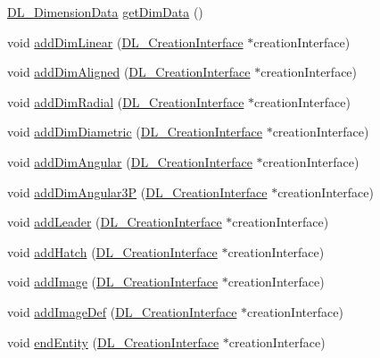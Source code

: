 \begin{DoxyCompactItemize}
\item 
\hyperlink{structDL__DimensionData}{D\-L\-\_\-\-Dimension\-Data} \hyperlink{classDL__Jww_a5a9706b7ab9fa9fe7c8ff45633d4f2c8}{get\-Dim\-Data} ()
\item 
void \hyperlink{classDL__Jww_aac79a956728e59e7eefa3093815c3f6f}{add\-Dim\-Linear} (\hyperlink{classDL__CreationInterface}{D\-L\-\_\-\-Creation\-Interface} $\ast$creation\-Interface)
\item 
void \hyperlink{classDL__Jww_a6cdb659715136c13300febe280540a60}{add\-Dim\-Aligned} (\hyperlink{classDL__CreationInterface}{D\-L\-\_\-\-Creation\-Interface} $\ast$creation\-Interface)
\item 
void \hyperlink{classDL__Jww_a3d755a59470ea63e942b7ee8adc61ba0}{add\-Dim\-Radial} (\hyperlink{classDL__CreationInterface}{D\-L\-\_\-\-Creation\-Interface} $\ast$creation\-Interface)
\item 
void \hyperlink{classDL__Jww_a622433317b17380b3202622ace625c9b}{add\-Dim\-Diametric} (\hyperlink{classDL__CreationInterface}{D\-L\-\_\-\-Creation\-Interface} $\ast$creation\-Interface)
\item 
void \hyperlink{classDL__Jww_af369b3ed0deb26433287b2f396e8f405}{add\-Dim\-Angular} (\hyperlink{classDL__CreationInterface}{D\-L\-\_\-\-Creation\-Interface} $\ast$creation\-Interface)
\item 
void \hyperlink{classDL__Jww_a9fc5ce1e80df56fc62854a618726b1c3}{add\-Dim\-Angular3\-P} (\hyperlink{classDL__CreationInterface}{D\-L\-\_\-\-Creation\-Interface} $\ast$creation\-Interface)
\item 
void \hyperlink{classDL__Jww_a464f0ff227afcac6aadb85c4d5c2dba2}{add\-Leader} (\hyperlink{classDL__CreationInterface}{D\-L\-\_\-\-Creation\-Interface} $\ast$creation\-Interface)
\item 
void \hyperlink{classDL__Jww_a638e43dfce889a5e84b2f5979eff7af1}{add\-Hatch} (\hyperlink{classDL__CreationInterface}{D\-L\-\_\-\-Creation\-Interface} $\ast$creation\-Interface)
\item 
void \hyperlink{classDL__Jww_a4d5716211e828da57656c6b751c1f248}{add\-Image} (\hyperlink{classDL__CreationInterface}{D\-L\-\_\-\-Creation\-Interface} $\ast$creation\-Interface)
\item 
void \hyperlink{classDL__Jww_a33aba2b7bbaf06fab909ce9547a08e8f}{add\-Image\-Def} (\hyperlink{classDL__CreationInterface}{D\-L\-\_\-\-Creation\-Interface} $\ast$creation\-Interface)
\item 
void \hyperlink{classDL__Jww_ac087ba128079598ea41ee114978a6bd2}{end\-Entity} (\hyperlink{classDL__CreationInterface}{D\-L\-\_\-\-Creation\-Interface} $\ast$creation\-Interface)

\end{DoxyCompactItemize}
